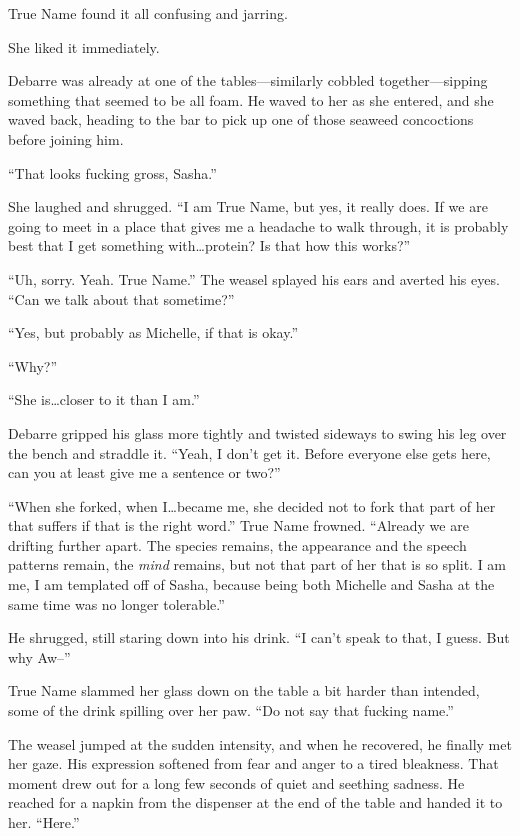 True Name found it all confusing and jarring.

She liked it immediately.

Debarre was already at one of the tables---similarly cobbled together---sipping something that seemed to be all foam. He waved to her as she entered, and she waved back, heading to the bar to pick up one of those seaweed concoctions before joining him.

``That looks fucking gross, Sasha.''

She laughed and shrugged. ``I am True Name, but yes, it really does. If we are going to meet in a place that gives me a headache to walk through, it is probably best that I get something with\ldots protein? Is that how this works?''

``Uh, sorry. Yeah. True Name.'' The weasel splayed his ears and averted his eyes. ``Can we talk about that sometime?''

``Yes, but probably as Michelle, if that is okay.''

``Why?''

``She is\ldots closer to it than I am.''

Debarre gripped his glass more tightly and twisted sideways to swing his leg over the bench and straddle it. ``Yeah, I don't get it. Before everyone else gets here, can you at least give me a sentence or two?''

``When she forked, when I\ldots became me, she decided not to fork that part of her that suffers if that is the right word.'' True Name frowned. ``Already we are drifting further apart. The species remains, the appearance and the speech patterns remain, the \emph{mind} remains, but not that part of her that is so split. I am me, I am templated off of Sasha, because being both Michelle and Sasha at the same time was no longer tolerable.''

He shrugged, still staring down into his drink. ``I can't speak to that, I guess. But why Aw--''

True Name slammed her glass down on the table a bit harder than intended, some of the drink spilling over her paw. ``Do not say that fucking name.''

The weasel jumped at the sudden intensity, and when he recovered, he finally met her gaze. His expression softened from fear and anger to a tired bleakness. That moment drew out for a long few seconds of quiet and seething sadness. He reached for a napkin from the dispenser at the end of the table and handed it to her. ``Here.''

